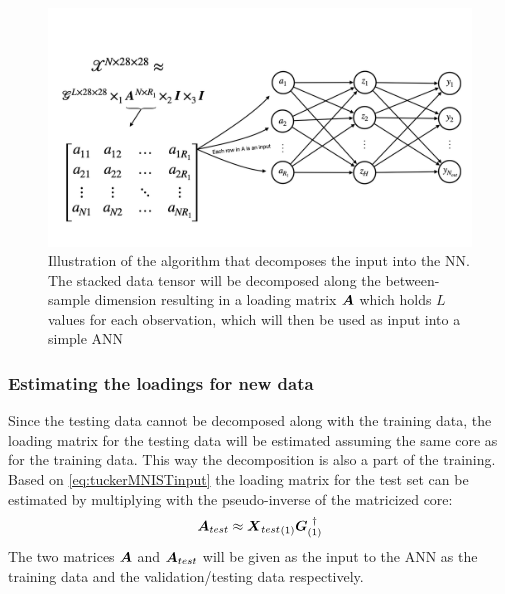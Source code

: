 \begin{figure}
    \centering
    \includegraphics[width=\linewidth]{Pics/05_methodology/input_decomp_illustration.png}
    \captionsetup{width=.95\linewidth}
    \caption{Illustration of the algorithm that decomposes the input into the NN. The stacked data tensor will be decomposed along the between-sample dimension resulting in a loading matrix $\boldsymbol{A}$ which holds $L$ values for each observation, which will then be used as input into a simple ANN}
    \label{fig:illustrationinputdecomp}
\end{figure}

\subsubsection{Estimating the loadings for new data}
Since the testing data cannot be decomposed along with the training data, the loading matrix for the testing data will be estimated assuming the same core as for the training data. This way the decomposition is also a part of the training. Based on \eqref{eq:tuckerMNISTinput} the loading matrix for the test set can be estimated by multiplying with the pseudo-inverse of the matricized core:
\begin{equation}
    \boldsymbol{A}_{test} \approx {\boldsymbol{X}_{test}}_{(1)} \boldsymbol{G}_{(1)}^{\ \dagger}
\end{equation}
The two matrices $\boldsymbol{A}$ and $\boldsymbol{A}_{test}$ will be given as the input to the ANN as the training data and the validation/testing data respectively.



